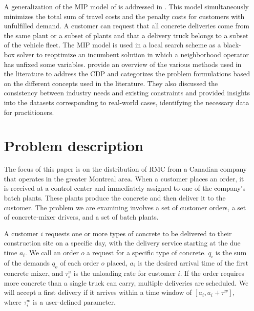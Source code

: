 \documentclass{article}
\begin{document}
A generalization of the MIP model of \cite{kinable2014concrete} is addressed in \cite{asbach2009analysis}. This model simultaneously minimizes the total sum of travel costs and the penalty costs for customers with unfulfilled demand. A customer can request that all concrete deliveries come from the same plant or a subset of plants and that a delivery truck belongs to a subset of the vehicle fleet. The MIP model is used in a local search scheme as a black-box solver to reoptimize an incumbent solution in which a neighborhood operator has unfixed some variables. \cite{tzanetos2023systematic} provide an overview of the various methods used in the literature to address the CDP and categorizes the problem formulations based on the different concepts used in the literature. They also discussed the consistency between industry needs and existing constraints and provided insights into the datasets corresponding to real-world cases, identifying the necessary data for practitioners.

\section{Problem description}
\label{desc_form}
The focus of this paper is on the distribution of RMC from a Canadian company that operates in the greater Montreal area. When a customer places an order, it is received at a control center and immediately assigned to one of the company's batch plants. These plants produce the concrete and then deliver it to the customer. The problem we are examining involves a set of customer orders, a set of concrete-mixer drivers, and a set of batch plants.


A customer $i$ requests one or more types of concrete to be delivered to their construction site on a specific day, with the delivery service starting at the due time $a_i$.  We call an order $o$ a request for a specific type of concrete. $q_i$ is the sum of the demands $q_o$ of each order $o$ placed, $a_i$ is the desired arrival time of the first concrete mixer, and $\tau^u_i$ is the unloading rate for customer $i$. If the order requires more concrete than a single truck can carry, multiple deliveries are scheduled. We will accept a first delivery if it arrives within a time window of $\left[a_i, a_i + \tau^w \right]$, where $\tau^w_i$ is a user-defined parameter.
\end{document}
